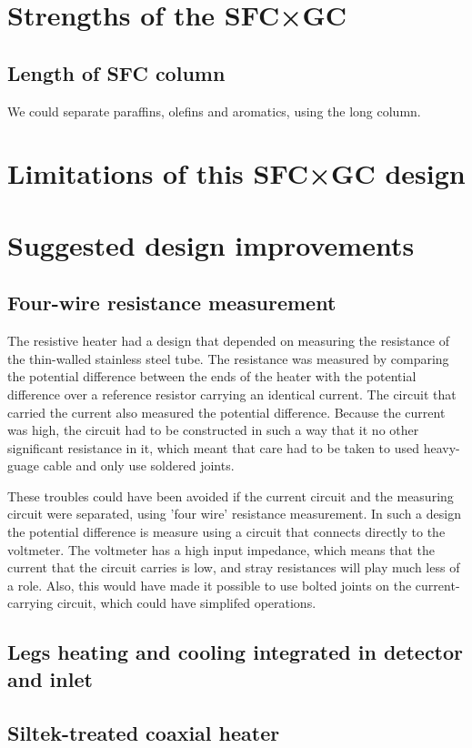 \section{Strengths of the SFC×GC}

\subsection{Length of SFC column}

We could separate paraffins, olefins and aromatics, using the long column.

\section{Limitations of this SFC×GC design}

\subsection{}

\section{Suggested design improvements}

\subsection{Four-wire resistance measurement}

The resistive heater had a design that depended on measuring the resistance of
the thin-walled stainless steel tube. The resistance was measured by comparing
the potential difference between the ends of the heater with the potential
difference over a reference resistor carrying an identical current. The circuit
that carried the current also measured the potential difference. Because the
current was high, the circuit had to be constructed in such a way that it no
other significant resistance in it, which meant that care had to be taken to
used heavy-guage cable and only use soldered joints. 

These troubles could have been avoided if the current circuit and the measuring
circuit were separated, using 'four wire' resistance measurement. In such a
design the potential difference is measure using a circuit that connects
directly to the voltmeter. The voltmeter has a high input impedance, which means
that the current that the circuit carries is low, and stray resistances will
play much less of a role. Also, this would have made it possible to use bolted
joints on the current-carrying circuit, which could have simplifed operations.

\subsection{Legs heating and cooling integrated in detector and inlet}


\subsection{Siltek-treated coaxial heater}



\todos
